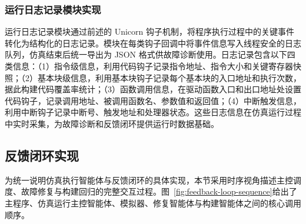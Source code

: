 \subsubsection{运行日志记录模块实现}

运行日志记录模块通过前述的 Unicorn 钩子机制，将程序执行过程中的关键事件转化为结构化的日志记录。模块在每类钩子回调中将事件信息写入线程安全的日志队列，仿真结束后统一导出为 JSON 格式供故障诊断使用。日志记录包含以下四类信息：（1）指令级信息，利用代码钩子记录指令地址、指令大小和关键寄存器快照；（2）基本块级信息，利用基本块钩子记录每个基本块的入口地址和执行次数，据此构建代码覆盖率统计；（3）函数调用信息，在驱动函数入口和出口地址处设置代码钩子，记录调用地址、被调用函数名、参数值和返回值；（4）中断触发信息，利用中断钩子记录中断号、触发地址和处理器状态。这些日志信息在仿真运行过程中实时采集，为故障诊断和反馈闭环提供运行时数据基础。

\subsection{反馈闭环实现}

为统一说明仿真执行智能体与反馈闭环的具体实现，本节采用时序视角描述主控调度、故障修复与构建回归的完整交互过程。图~\ref{fig:feedback-loop-sequence}给出了主程序、仿真运行主控智能体、模拟器、修复智能体与构建智能体之间的核心调用顺序。

